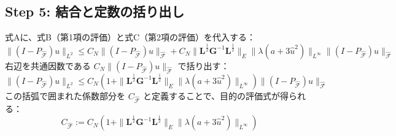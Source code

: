 \documentclass[a4paper, 11pt]{ltjsreport}
\theoremstyle{plain}
\theoremstyle{definition}
\begin{document}
\subsection*{Step 5: 結合と定数の括り出し}
式Aに、式B（第1項の評価）と式C（第2項の評価）を代入する：
\begin{equation}
\|(I - P_{\hat{\mathcal{F}}})u\|_{L^2} \le C_N \|(I - P_{\hat{\mathcal{F}}})u\|_{\hat{\mathcal{F}}} + C_N \|\mathbf{L}^{\frac{1}{2}} \mathbf{G}^{-1} \mathbf{L}^{\frac{1}{2}}\|_E \|\lambda(a+3\hat{u}^2)\|_{L^\infty} \|(I - P_{\hat{\mathcal{F}}})u\|_{\hat{\mathcal{F}}}
\end{equation}
右辺を共通因数である $C_N \|(I - P_{\hat{\mathcal{F}}})u\|_{\hat{\mathcal{F}}}$ で括り出す：
\begin{equation}
\|(I - P_{\hat{\mathcal{F}}})u\|_{L^2} \le C_N \left( 1 + \|\mathbf{L}^{\frac{1}{2}} \mathbf{G}^{-1} \mathbf{L}^{\frac{1}{2}}\|_E \|\lambda(a + 3\hat{u}^2)\|_{L^\infty} \right) \|(I - P_{\hat{\mathcal{F}}})u\|_{\hat{\mathcal{F}}}
\end{equation}
この括弧で囲まれた係数部分を $C_{\hat{\mathcal{F}}}$ と定義することで、目的の評価式が得られる：
\begin{equation}
C_{\hat{\mathcal{F}}} := C_N \left( 1 + \|\mathbf{L}^{\frac{1}{2}} \mathbf{G}^{-1} \mathbf{L}^{\frac{1}{2}}\|_E \|\lambda(a + 3\hat{u}^2)\|_{L^\infty} \right)
\end{equation}
\end{document}
